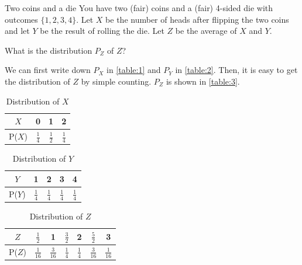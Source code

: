 \documentclass[a4paper,10pt]{article}
\begin{document}


\begin{nproblem}{7}{Two coins and a die}
You have two (fair) coins and a (fair) 4-sided die with outcomes $\{1,2,3,4\}$. Let $X$ be the number of heads after flipping the two coins and let $Y$ be the result of rolling the die. Let $Z$ be the average of $X$ and $Y$.
\end{nproblem}

\begin{subproblem}{2}
What is the distribution $P_Z$ of $Z$?
\end{subproblem}

\begin{solution}
We can first write down $P_X$ in \autoref{table:1} and $P_Y$ in \autoref{table:2}. Then, it is easy to get the distribution of $Z$ by simple counting. $P_Z$ is shown in \autoref{table:3}.

\begin{table}[ht]
\centering
\caption{Distribution of $X$}
\begin{tabular}{c c c c}
\hline
$X$ & 0 & 1 & 2 \\ [0.5ex]
\hline
P($X$)& $\frac{1}{4}$ & $\frac{1}{2}$ & $\frac{1}{4}$ \\
\hline
\end{tabular}
\label{table:1}
\end{table}

\begin{table}[ht]
\caption{Distribution of $Y$}
\centering
\begin{tabular}{c c c c c}
\hline
$Y$ & 1 & 2 & 3 & 4 \\ [0.5ex]
\hline
P($Y$)& $\frac{1}{4}$ & $\frac{1}{4}$ & $\frac{1}{4}$ & $\frac{1}{4}$\\
\hline
\end{tabular}
\label{table:2}
\end{table}

\begin{table}[ht]
\caption{Distribution of $Z$}
\centering
\begin{tabular}{c c c c c c c}
\hline
$Z$ & $\frac{1}{2}$ & 1 & $\frac{3}{2}$ & 2 & $\frac{5}{2}$ & 3\\ [0.5ex]
\hline
P($Z$) & $\frac{1}{16}$ & $\frac{3}{16}$ & $\frac{1}{4}$ & $\frac{1}{4}$ & $\frac{3}{16}$ & $\frac{1}{16}$\\
\hline
\end{tabular}
\label{table:3}
\end{table}
\end{solution}
\end{document}
